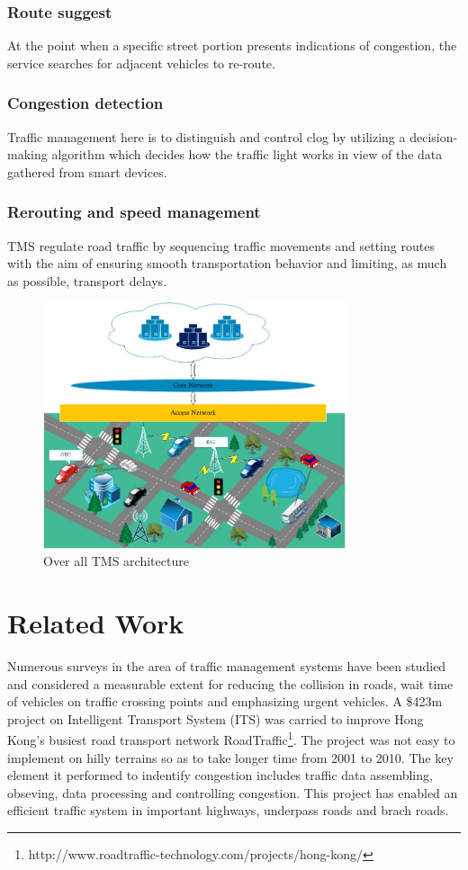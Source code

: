 \documentclass[conference]{IEEEtran}
\begin{document}
\subsubsection{Route suggest}
At the point when a specific street portion presents indications of congestion, the service searches for adjacent vehicles to re-route.
\subsubsection{Congestion detection}
Traffic management here is to distinguish and control clog by utilizing a decision-making algorithm which decides how the traffic light works in view of the data gathered from smart devices.
\subsubsection{Rerouting and speed management}
TMS regulate road traffic by sequencing traffic movements and setting routes with the aim of ensuring smooth transportation behavior and limiting, as much as possible, transport delays.
\begin{figure}[!ht]
\centering
\includegraphics[width=3.5in]{wireless_traffice}
\caption{Over all TMS architecture}
\label{wireless}
\end{figure}



\section{Related Work}
Numerous surveys in the area of traffic management systems have been studied and considered a measurable extent for reducing the collision in roads, wait time of vehicles on traffic crossing points and emphasizing urgent vehicles. A \$423m project on Intelligent Transport System (ITS) was carried to improve Hong Kong's busiest road transport network RoadTraffic\footnote{http://www.roadtraffic-technology.com/projects/hong-kong/}. The project was not easy to implement on hilly terrains so as to take longer time from 2001 to 2010. The key element it performed to indentify congestion includes traffic data assembling, obseving, data processing and controlling congestion. This project has enabled an efficient traffic system in important highways, underpass roads and brach roads.
\end{document}
